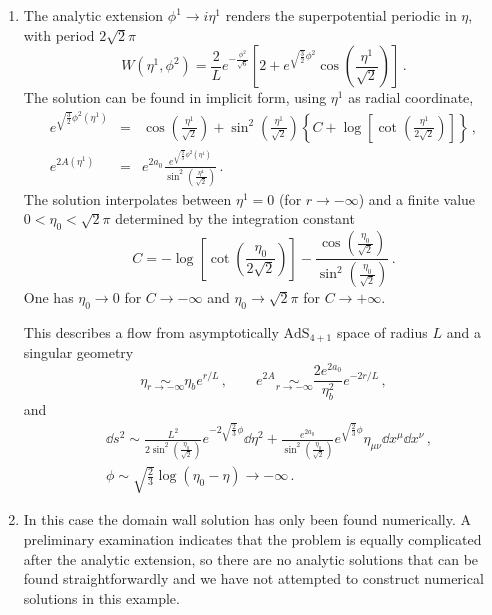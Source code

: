 \begin{enumerate}
	\item The analytic extension $\phi^1\to i\eta^1                     $ renders the superpotential periodic in $\eta$, with period $2\sqrt{2}\pi$
\begin{equation}\label{eq:supex3}
	W(\eta^1,\phi^2) = \frac{2}{L}e^{-\frac{\phi^2}{\sqrt{6}}} \left[2+e^{\sqrt{\frac{3}{2}}\phi^2}\cos\left(\frac{\eta^1}{\sqrt{2}}\right)\right]\,.
\end{equation}
The solution can be found in implicit form, using $\eta^1$ as radial coordinate,
\begin{subequations}
\begin{eqnarray}
	e^{\sqrt{\frac{3}{2}}\phi^2(\eta^1)} &=&\cos\left(\frac{\eta^1}{\sqrt{2}}\right)+\sin^2\left(\frac{\eta^1}{\sqrt{2}}\right)\left\{C+\log\left[\cot\left(\frac{\eta^1}{2\sqrt{2}}\right)\right]\right\}
	\,,\\
	e^{2A(\eta^1)} &=& e^{2a_0}\frac{e^{\sqrt{\frac{2}{3}}\phi^2(\eta^1)}}{\sin^2\left(\frac{\eta^1}{\sqrt{2}}\right)}\,.
\end{eqnarray}
\end{subequations}
The solution interpolates between $\eta^1=0$ (for $r\to -\infty$) and a finite value $0<\eta_0<\sqrt{2}\pi$ determined by the integration constant
\begin{equation}
	C=-\log\left[\cot\left(\frac{\eta_0}{2\sqrt{2}}\right)\right]-\frac{\cos\left(\frac{\eta_0}{\sqrt{2}}\right)}{\sin^2\left(\frac{\eta_0}{\sqrt{2}}\right)}\,.
\end{equation}
One has $\eta_0 \to 0$ for $C\to -\infty$ and $\eta_0 \to \sqrt{2}\pi$ for $C\to +\infty$.

This describes a flow from asymptotically $\text{AdS}_{4+1}$ space of radius $L$ and a singular geometry
\begin{equation}
	\eta \underset{r\to-\infty}{\sim} \eta_b e^{r/L}
	\,,\qquad
	e^{2A} \underset{r\to-\infty}{\sim} \frac{2e^{2a_0}}{\eta_b^2}e^{-2r/L}\,,
\end{equation}
and
\begin{align}
	&\dd s^2\sim \frac{L^2}{2\sin^2\left(\frac{\eta_0}{\sqrt{2}}\right)} e^{-2\sqrt{\frac{2}{3}}\phi}\dd\eta^2+\frac{e^{2a_0}}{\sin^2\left(\frac{\eta_0}{\sqrt{2}}\right)}e^{\sqrt{\frac{2}{3}}\phi}\eta_{\mu\nu}\dd x^\mu \dd x^\nu
	\,, \\ 
	&\phi\sim \sqrt{\frac{2}{3}}\log(\eta_0-\eta) \to -\infty\,.
\end{align}

	\item In this case the domain wall solution has only been found numerically.
	A preliminary examination indicates that the problem is equally complicated after the analytic extension, so there are no analytic solutions that can be found straightforwardly and we have not attempted to construct numerical solutions in this example.
    

\end{enumerate}
